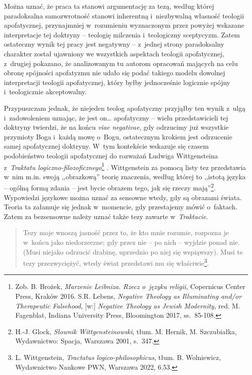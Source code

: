 Można uznać, że praca ta stanowi argumentację za tezą, według której paradoksalna samozwrotność stanowi inherentną i~niezbywalną własność teologii apofatycznej, przynajmniej w~rozumieniu wyznaczonym przez powyżej wskazane interpretacje tej doktryny -- teologię milczenia i~teologiczny sceptycyzm. Zatem ostateczny wynik tej pracy jest negatywny -- z~jednej strony paradoksalny charakter został ujawniony we wszystkich aspektach teologii apofatycznej, z~drugiej pokazano, że analizowanym tu autorom opracowań mających na celu obronę spójności apofatyzmu nie udało się podać takiego modelu dowolnej interpretacji teologii apofatycznej, który byłby jednocześnie logicznie spójny i~teologicznie akceptowalny.

Przypuszczam jednak, że niejeden teolog apofatyczny przyjąłby ten wynik z~ulgą i~zadowoleniem uznając, że jest on… apofatyczny -- wielu przedstawicieli tej doktryny twierdzi, że na końcu \textit{viae negativae}, gdy odrzucimy już wszystkie przymioty Boga i~każdą mowę o~Bogu, ostatecznym krokiem jest odrzucenie samej apofatycznej doktryny.
W~tym kontekście wskazuje się czasem podobieństwo teologii apofatycznej do rozważań Ludwiga Wittgensteina z~\textit{Traktatu logiczno-filozoficznego}\footnote{Zob. B. Brożek, \textit{Marzenie Leibniza. Rzecz o~języku religii}, Copernicus Center Press, Kraków 2016. S.R. Lebens, \textit{Negative Theology as Illuminating and/or Therapeutic Falsehood}, [w:] \textit{Negative Theology as Jewish Modernity}, red. M. Fagenblat, Indiana University Press, Bloomington 2017, ss.~85-108.}
. Wittgenstein za pomocą listy tez przedstawia w~nim m.in. swoją ,,obrazkową'' teorię znaczenia, według której to ,,istotą języka -- ogólną formą zdania -- jest bycie obrazem tego, jak się rzeczy mają''\footnote{H.-J. Glock, \textit{Słownik Wittgensteinowski}, tłum. M. Hernik, M. Szczubiałka, Wydawnictwo: Spacja, Warszawa 2001, s.~347.}. Wypowiedzi językowe można uznać za sensowne wtedy, gdy są obrazami świata. Teoria ta załamuje się jednak w~momencie, gdy przestajemy mówić o~faktach. Zatem za bezsensowne należy uznać także tezy zawarte w~\textit{Traktacie}.

\begin{quote}
Tezy moje wnoszą jasność przez to, że kto mnie rozumie, rozpozna je w~końcu jako niedorzeczne; gdy przez nie -- po nich -- wyjdzie ponad nie. (Musi niejako odrzucić drabinę, uprzednio po niej się wspiąwszy). Musi te tezy przezwyciężyć, wtedy świat przedstawi mu się właściwie\footnote{L. Wittgenstein, \textit{Tractatus logico-philosophicus}, tłum. B. Wolniewicz, Wydawnictwo Naukowe PWN, Warszawa 2022, 6.53.}.
\end{quote}

